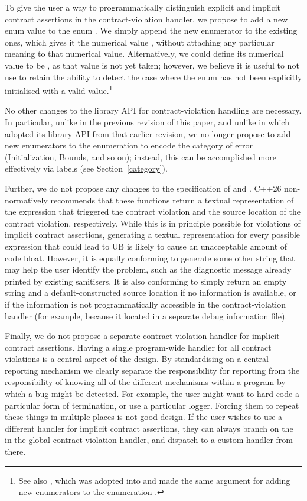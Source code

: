 To give the user a way to programmatically distinguish explicit and implicit contract assertions in the contract-violation handler, we propose to add a new enum value  to the enum \mbox{}. We simply append the new enumerator to the existing ones, which gives it the numerical value , without attaching any particular meaning to that numerical value. Alternatively, we could define its numerical value to be , as that value is not yet taken; however, we believe it is useful to not use  to retain the ability to detect the case where the enum has not been explicitly initialised with a valid value.\footnote{See also \cite{P3227R0}, which was adopted into \cite{P2900R14} and made the same argument for adding new enumerators to the enumeration .}

No other changes to the library API for contract-violation handling are necessary. In particular, unlike in the previous revision of this paper, and unlike in \cite{P3081R1} which adopted its library API from that earlier revision, we no longer propose to add new enumerators to the enumeration \mbox{} to encode the category of error (Initialization, Bounds, and so on); instead, this can be accomplished more effectively via labels (see Section~\ref{category}).

Further, we do not propose any changes to the specification of  and . C++26 non-normatively recommends that these functions return a textual representation of the expression that triggered the contract violation and the source location of the contract violation, respectively. While this is in principle possible for violations of implicit contract assertions, generating a textual representation for every possible expression that could lead to UB is likely to cause an unacceptable amount of code bloat. However, it is equally conforming to generate some other string that may help the user identify the problem, such as the diagnostic message already printed by existing sanitisers. It is also conforming to simply return an empty string and a default-constructed source location if no information is available, or if the information is not programmatically accessible in the contract-violation handler (for example,
because it located in a separate debug information file). 

Finally, we do not propose a separate contract-violation handler for implicit contract assertions. Having a single program-wide handler for all contract violations is a central aspect of the \cite{P2900R14} design. By standardising on a central reporting mechanism we clearly separate the responsibility for reporting from the responsibility of knowing all of the different mechanisms within a program by which a bug might be detected. For example, the user might want to hard-code a particular form of termination, or use a particular logger. Forcing them to repeat these things in multiple places is not good design. If the user  wishes to use a different handler for implicit contract assertions, they can always branch on the  in the global contract-violation handler, and dispatch to a custom handler from there.

